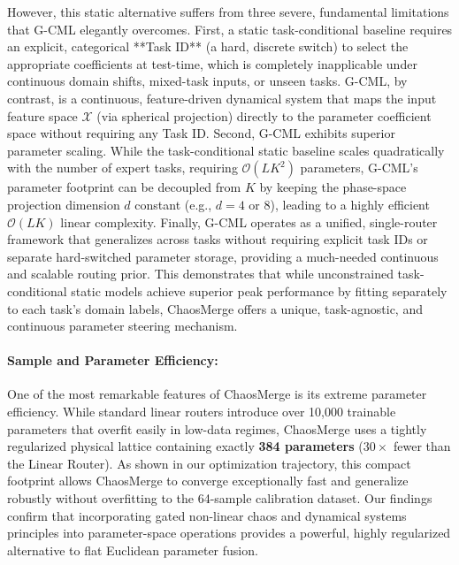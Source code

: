 However, this static alternative suffers from three severe, fundamental limitations that G-CML elegantly overcomes. First, a static task-conditional baseline requires an explicit, categorical **Task ID** (a hard, discrete switch) to select the appropriate coefficients at test-time, which is completely inapplicable under continuous domain shifts, mixed-task inputs, or unseen tasks. G-CML, by contrast, is a continuous, feature-driven dynamical system that maps the input feature space $\mathcal{X}$ (via spherical projection) directly to the parameter coefficient space without requiring any Task ID. Second, G-CML exhibits superior parameter scaling. While the task-conditional static baseline scales quadratically with the number of expert tasks, requiring $\mathcal{O}(L K^2)$ parameters, G-CML's parameter footprint can be decoupled from $K$ by keeping the phase-space projection dimension $d$ constant (e.g., $d=4$ or $8$), leading to a highly efficient $\mathcal{O}(L K)$ linear complexity. Finally, G-CML operates as a unified, single-router framework that generalizes across tasks without requiring explicit task IDs or separate hard-switched parameter storage, providing a much-needed continuous and scalable routing prior. This demonstrates that while unconstrained task-conditional static models achieve superior peak performance by fitting separately to each task's domain labels, ChaosMerge offers a unique, task-agnostic, and continuous parameter steering mechanism.

\paragraph{Sample and Parameter Efficiency:}
One of the most remarkable features of ChaosMerge is its extreme parameter efficiency.
While standard linear routers introduce over 10,000 trainable parameters that overfit easily in low-data regimes, ChaosMerge uses a tightly regularized physical lattice containing exactly \textbf{384 parameters} ($30\times$ fewer than the Linear Router).
As shown in our optimization trajectory, this compact footprint allows ChaosMerge to converge exceptionally fast and generalize robustly without overfitting to the 64-sample calibration dataset.
Our findings confirm that incorporating gated non-linear chaos and dynamical systems principles into parameter-space operations provides a powerful, highly regularized alternative to flat Euclidean parameter fusion.

